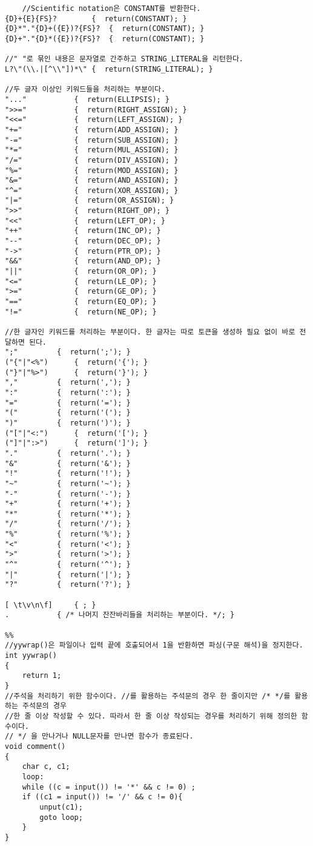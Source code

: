 \documentclass{article}
\begin{document}
\begin{verbatim}
	//Scientific notation은 CONSTANT를 반환한다.
{D}+{E}{FS}?		{  return(CONSTANT); }
{D}*"."{D}+({E})?{FS}?	{  return(CONSTANT); }
{D}+"."{D}*({E})?{FS}?	{  return(CONSTANT); }

//" "로 묶인 내용은 문자열로 간주하고 STRING_LITERAL을 리턴한다.
L?\"(\\.|[^\\"])*\"	{  return(STRING_LITERAL); }

//두 글자 이상인 키워드들을 처리하는 부분이다.
"..."			{  return(ELLIPSIS); }
">>="			{  return(RIGHT_ASSIGN); }
"<<="			{  return(LEFT_ASSIGN); }
"+="			{  return(ADD_ASSIGN); }
"-="			{  return(SUB_ASSIGN); }
"*="			{  return(MUL_ASSIGN); }
"/="			{  return(DIV_ASSIGN); }
"%="			{  return(MOD_ASSIGN); }
"&="			{  return(AND_ASSIGN); }
"^="			{  return(XOR_ASSIGN); }
"|="			{  return(OR_ASSIGN); }
">>"			{  return(RIGHT_OP); }
"<<"			{  return(LEFT_OP); }
"++"			{  return(INC_OP); }
"--"			{  return(DEC_OP); }
"->"			{  return(PTR_OP); }
"&&"			{  return(AND_OP); }
"||"			{  return(OR_OP); }
"<="			{  return(LE_OP); }
">="			{  return(GE_OP); }
"=="			{  return(EQ_OP); }
"!="			{  return(NE_OP); }

//한 글자인 키워드를 처리하는 부분이다. 한 글자는 따로 토큰을 생성하 필요 없이 바로 전달하면 된다.
";"			{  return(';'); }
("{"|"<%")		{  return('{'); }
("}"|"%>")		{  return('}'); }
","			{  return(','); }
":"			{  return(':'); }
"="			{  return('='); }
"("			{  return('('); }
")"			{  return(')'); }
("["|"<:")		{  return('['); }
("]"|":>")		{  return(']'); }
"."			{  return('.'); }
"&"			{  return('&'); }
"!"			{  return('!'); }
"~"			{  return('~'); }
"-"			{  return('-'); }
"+"			{  return('+'); }
"*"			{  return('*'); }
"/"			{  return('/'); }
"%"			{  return('%'); }
"<"			{  return('<'); }
">"			{  return('>'); }
"^"			{  return('^'); }
"|"			{  return('|'); }
"?"			{  return('?'); }

[ \t\v\n\f]		{ ; }
.			{ /* 나머지 잔잔바리들을 처리하는 부분이다. */; }

%%
//yywrap()은 파일이나 입력 끝에 호출되어서 1을 반환하면 파싱(구문 해석)을 정지한다.  
int yywrap()
{
	return 1;
}
//주석을 처리하기 위한 함수이다. //를 활용하는 주석문의 경우 한 줄이지만 /* */를 활용하는 주석문의 경우
//한 줄 이상 작성할 수 있다. 따라서 한 줄 이상 작성되는 경우를 처리하기 위해 정의한 함수이다.
// */ 을 만나거나 NULL문자를 만나면 함수가 종료된다.
void comment()
{
	char c, c1;
	loop:
	while ((c = input()) != '*' && c != 0) ;
	if ((c1 = input()) != '/' && c != 0){
		unput(c1);
		goto loop;
	}
}
\end{verbatim}
\end{document}
